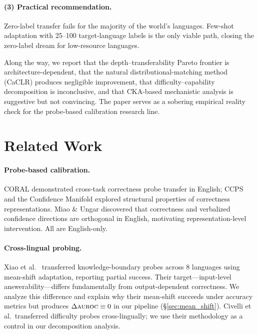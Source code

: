 \documentclass[11pt,a4paper]{article}
\newcommand{\auroc}{\textsc{auroc}}
\begin{document}
\paragraph{(3) Practical recommendation.} Zero-label transfer fails for the majority of the world's languages. Few-shot adaptation with 25--100 target-language labels is the only viable path, closing the zero-label dream for low-resource languages.

Along the way, we report that the depth--transferability Pareto frontier is architecture-dependent, that the natural distributional-matching method (CaCLR) produces negligible improvement, that difficulty--capability decomposition is inconclusive, and that CKA-based mechanistic analysis is suggestive but not convincing. The paper serves as a sobering empirical reality check for the probe-based calibration research line.

\section{Related Work}
\label{sec:related}

\paragraph{Probe-based calibration.}
CORAL \cite{miao2024coral} demonstrated cross-task correctness probe transfer in English; CCPS \cite{liu2024confidence} and the Confidence Manifold \cite{luo2024confidence} explored structural properties of correctness representations. Miao \& Ungar \cite{miao2026orthogonality} discovered that correctness and verbalized confidence directions are orthogonal in English, motivating representation-level intervention. All are English-only.

\paragraph{Cross-lingual probing.}
Xiao et al.\ \cite{xiao2025knowledge} transferred knowledge-boundary probes across 8 languages using mean-shift adaptation, reporting partial success. Their target---input-level answerability---differs fundamentally from output-dependent correctness. We analyze this difference and explain why their mean-shift succeeds under accuracy metrics but produces $\Delta\auroc{} \equiv 0$ in our pipeline (\S\ref{sec:mean_shift}). Civelli et al.\ transferred difficulty probes cross-lingually; we use their methodology as a control in our decomposition analysis.
\end{document}
